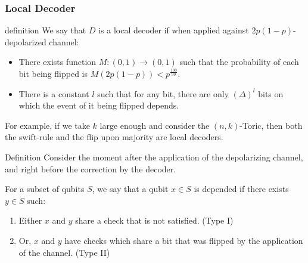 \documentclass{beamer}
\begin{document}
\begin{frame}
  \frametitle{Local Decoder} 
  
  \begin{block}{definition}
    We say that $D$ is a local decoder if when applied against $2p(1-p)$-depolarized channel: 
    \begin{itemize}
      \item  There exists function $M : (0,1) \rightarrow (0,1) $ such that the probability of each bit being flipped is $M(2p(1-p)) < p^{\frac{100}{99}}$.
      \item There is a constant $l$ such that for any bit, there are only $(\Delta)^{l}$ bits on which the event of it being flipped depends.
    \end{itemize}
For example, if we take $k$ large enough and consider the $(n,k)$-Toric, then both the swift-rule and the flip upon majority are local decoders.
  \end{block}
\end{frame}

\begin{frame}
  \begin{block}{Definition}
Consider the moment after the application of the depolarizing channel, and right before the correction by the decoder.

For a subset of qubits $S$, we say that a qubit $x \in S$ is depended if there exists $y \in S$ such:
\begin{enumerate}
  \item Either $x$ and $y$ share a check that is not satisfied. (Type I)  
  \item Or, $x$ and $y$ have checks which share a bit that was flipped by the application of the channel. (Type II)
\end{enumerate}
  \end{block}
\end{frame}
\end{document}
